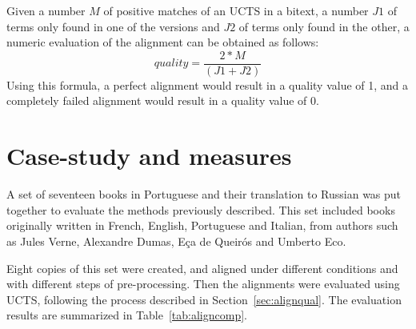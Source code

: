 \documentclass[a4paper,russian,UKenglish]{oasics}
\begin{document}
Given a number $M$ of positive matches of an UCTS in a bitext, a number $J1$ of terms only found in one of the versions and $J2$ of terms only found in the other, a numeric evaluation of the alignment can be obtained as follows:
$$ quality = \frac{2*M}{(J1+J2)}$$
Using this formula, a perfect alignment would result in a quality value of 1, and a completely failed alignment would result in a quality value of 0.



\section{Case-study and measures}

A set of seventeen books in Portuguese and their translation to Russian was put together to evaluate the methods previously described. This set included books originally written in French, English, Portuguese and Italian, from authors such as Jules Verne, Alexandre Dumas, Eça de Queirós and Umberto Eco.

Eight copies of this set were created, and aligned under different conditions and with different steps of pre-processing. Then the alignments were evaluated using UCTS, following the process described in Section~\ref{sec:alignqual}. The evaluation results are summarized in Table~\ref{tab:aligncomp}.
\end{document}
